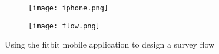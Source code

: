 

\begin{figure}
    \begin{subfigure}[t]{0.3\textwidth}
        \texttt{[image: iphone.png]}
    \end{subfigure}
    \begin{subfigure}[t]{0.3\textwidth}
        \texttt{[image: flow.png]}
    \end{subfigure}
    \caption{Using the fitbit mobile application to design a survey flow}
    \label{fig:homescreen}
\end{figure}






